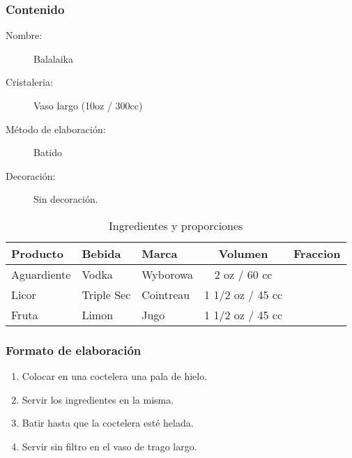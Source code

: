 \bigskip 
\bigskip 
\subsubsection{Contenido}
\bigskip 

\begin{description}
\item[Nombre:] Balalaika
\item[Cristaleria:] Vaso largo (10oz / 300cc)
\item[M\'etodo de elaboraci\'on:] Batido
\item[Decoraci\'on:] Sin decoraci\'on.
\end{description}

\begin{table}[h]
\caption{Ingredientes y proporciones} 
\label{tab:fonts}
\begin{center}       
\begin{tabular}{|l|l|l|c|l|} %
\hline
\rule[-1ex]{0pt}{3.5ex}  \textbf{Producto} & \textbf{Bebida} & \textbf{Marca} & \textbf{Volumen} & \textbf{Fraccion}  \\
\hline
\rule[-1ex]{0pt}{3.5ex}  Aguardiente & Vodka 			& Wyborowa 		& 2 oz / 60 cc 	&  	\\
\hline
\rule[-1ex]{0pt}{3.5ex}  Licor 		& Triple Sec 	& Cointreau 				& 1 1/2 oz / 45 cc 		&  	\\
\hline
\rule[-1ex]{0pt}{3.5ex}  Fruta 		& Limon & Jugo	& 1 1/2 oz / 45 cc		& 	\\
\hline

\end{tabular}
\end{center}
\end{table} 
\bigskip 

\subsubsection{Formato de elaboraci\'on} 
\label{sec:title}
\bigskip 
\begin{center}
\begin{enumerate}
\item Colocar en una coctelera una pala de hielo.
\item Servir los ingredientes en la misma.
\item Batir hasta que la coctelera est\'e helada.
\item Servir sin filtro en el vaso de trago largo.

\end{enumerate}
\end{center}
\bigskip 
\bigskip 

